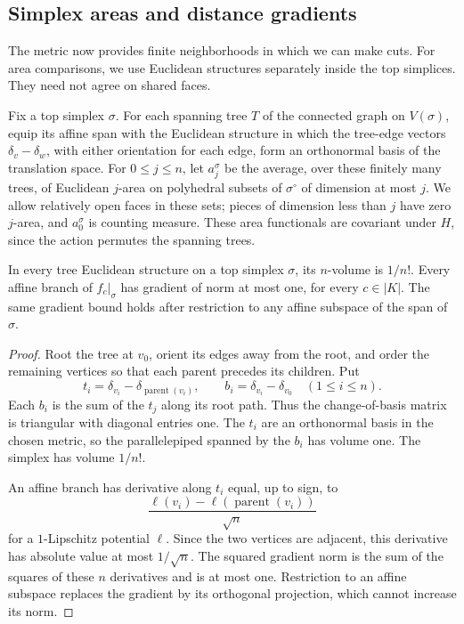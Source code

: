\subsection{Simplex areas and distance gradients}

The metric now provides finite neighborhoods in which we can make
cuts.  For area comparisons, we use Euclidean structures separately
inside the top simplices.  They need not agree on shared faces.

Fix a top simplex \(\sigma\).  For each spanning tree \(T\) of the
connected graph on \(V(\sigma)\), equip its affine span with the
Euclidean structure in which the tree-edge vectors
\(\delta_v-\delta_w\), with either orientation for each edge, form
an orthonormal basis of the translation space.  For \(0\leq j\leq n\),
let \(a_j^\sigma\) be the average, over these finitely many trees,
of Euclidean \(j\)-area on polyhedral subsets of \(\sigma^\circ\)
of dimension at most \(j\).  We allow relatively open faces in
these sets; pieces of dimension less than \(j\) have zero
\(j\)-area, and \(a_0^\sigma\) is counting measure.  These area
functionals are covariant under \(H\), since the action permutes
the spanning trees.

\begin{lemma}\label{lem:tree}
In every tree Euclidean structure on a top simplex \(\sigma\), its
\(n\)-volume is \(1/n!\).  Every affine branch of \(f_c|_\sigma\)
has gradient of norm at most one, for every \(c\in|K|\).
The same gradient bound holds after restriction to any affine
subspace of the span of \(\sigma\).
\end{lemma}

\begin{proof}
Root the tree at \(v_0\), orient its edges away from the root, and
order the remaining vertices so that each parent precedes its
children.  Put
\[
 t_i=\delta_{v_i}-\delta_{\operatorname{parent}(v_i)},
 \qquad b_i=\delta_{v_i}-\delta_{v_0}
 \quad(1\leq i\leq n).
\]
Each \(b_i\) is the sum of the \(t_j\) along its root path.
Thus the change-of-basis matrix is triangular with diagonal
entries one.  The \(t_i\) are an orthonormal basis in the chosen
metric, so the parallelepiped spanned by the \(b_i\) has volume
one.  The simplex has volume \(1/n!\).

An affine branch has derivative along \(t_i\) equal, up to sign, to
\[
 \frac{\ell(v_i)-\ell(\operatorname{parent}(v_i))}{\sqrt n}
\]
for a \(1\)-Lipschitz potential \(\ell\).  Since the two vertices
are adjacent, this derivative has absolute value at most
\(1/\sqrt n\).  The squared gradient norm is the sum of the
squares of these \(n\) derivatives and is at most one.
Restriction to an affine subspace replaces the gradient by its
orthogonal projection, which cannot increase its norm.
\end{proof}

